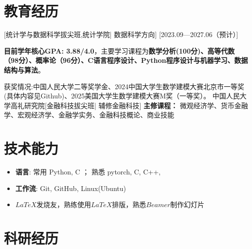 \documentclass{resume}
\begin{document}


\ResumeTitle


\section{教育经历}
[\textnormal{统计学与数据科学拔尖班,统计学院|} 数据科学方向]
[2023.09—2027.06（预计）]

\textbf{目前学年核心GPA: 3.88/4.0}，主要学习课程为\textbf{数学分析(100分)、高等代数（98分）、概率论（96分）、C语言程序设计、Python程序设计与机器学习、数据结构与算法}。

获奖情况:中国人民大学二等奖学金、2024中国大学生数学建模大赛北京市一等奖(具体内容见Github)、2025美国大学生数学建模大赛M奖（一等奖）。
\ResumeItem
{中国人民大学高礼研究院}[\textnormal{金融科技拔尖班|} 辅修金融科技]
\textbf{主修课程：} 微观经济学、货币金融学、宏观经济学、金融学实务、金融科技概论、商业技能

\section[技术能力]{技术能力\protect}
\begin{itemize}
  \item \textbf{语言}: 常用 Python, C ； 熟悉 pytorch, C, C++, 
  \item \textbf{工作流}: Git, GitHub, Linux(Ubuntu)
  \item $LaTeX$发烧友，熟练使用$LaTeX$排版，熟悉$Beamer$制作幻灯片
\end{itemize}

\section{科研经历}
\end{document}

